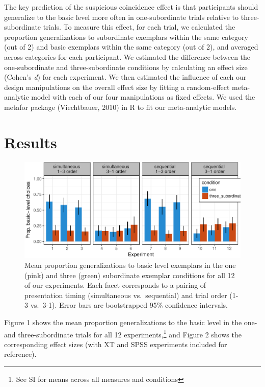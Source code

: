 \documentclass[english,floatsintext,man]{apa6}
\theoremstyle{definition}
\theoremstyle{definition}
\theoremstyle{remark}
\begin{document}
The key prediction of the suspicious coincidence effect is that
participants should generalize to the basic level more often in
one-subordinate trials relative to three-subordinate trials. To measure
this effect, for each trial, we calculated the proportion
generalizations to subordinate exemplars within the same category (out
of 2) and basic exemplars within the same category (out of 2), and
averaged across categories for each participant. We estimated the
difference between the one-subordinate and three-subordinate conditions
by calculating an effect size (Cohen's \emph{d}) for each experiment. We
then estimated the influence of each our design manipulations on the
overall effect size by fitting a random-effect meta-analytic model with
each of our four manipulations as fixed effects. We used the metafor
package (Viechtbauer, 2010) in R to fit our meta-analytic models.

\section{Results}\label{results}

\begin{figure}[htbp]
\centering
\includegraphics{xtmem_files/figure-latex/unnamed-chunk-3-1.pdf}
\caption{\label{fig:unnamed-chunk-3}Mean proportion generalizations to basic
level exemplars in the one (pink) and three (green) subordinate exemplar
conditions for all 12 of our experiments. Each facet corresponds to a
pairing of presentation timing (simultaneous vs.~sequential) and trial
order (1-3 vs.~3-1). Error bars are bootstrapped 95\% confidence
intervals.}
\end{figure}

Figure 1 shows the mean proportion generalizations to the basic level in
the one- and three-subordinate trials for all 12
experiments,\footnote{See SI for means across all measures and conditions}
and Figure 2 shows the corresponding effect sizes (with XT and SPSS
experiments included for reference).
\end{document}
